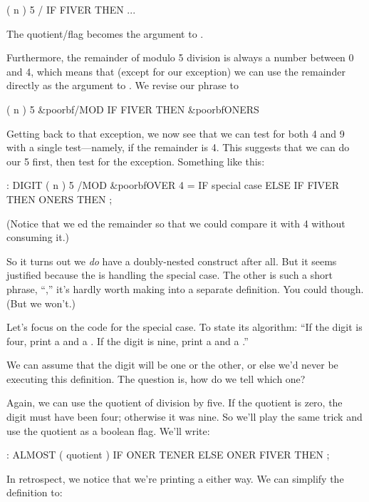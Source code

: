 \begin{Code}
( n )  5 / IF FIVER THEN ...
\end{Code}
The quotient/flag becomes the argument to .

Furthermore, the remainder of modulo 5 division is always a number between
0 and 4, which means that (except for our exception) we can use the
remainder directly as the argument to . We revise our phrase
to

\begin{Code}[commandchars=\&\{\}]
( n )  5 &poorbf{/MOD} IF FIVER THEN  &poorbf{ONERS}
\end{Code}
Getting back to that exception, we now see that we can test for both 4 and
9 with a single test---namely, if the remainder is 4. This suggests that
we can do our 5  first, then test for the exception.
Something like this:

\begin{Code}[commandchars=\&\{\}]
: DIGIT  ( n )
     5 /MOD  &poorbf{OVER 4 =  IF  special case  ELSE}
     IF FIVER THEN  ONERS  THEN ;
\end{Code}
(Notice that we ed the remainder so that we could compare it with
4 without consuming it.)

So it turns out we \emph{do} have a doubly-nested 
construct after all. But it seems justified because the 
is handling the special case. The other is such a short phrase,
``,'' it's hardly worth making into a separate
definition. You could though. (But we won't.)

Let's focus on the code for the special case. To state its algorithm: ``If
the digit is four, print a  and a . If the digit
is nine, print a  and a .''

We can assume that the digit will be one or the other, or else we'd never
be executing this definition. The question is, how do we tell which one?

Again, we can use the quotient of division by five. If the quotient is
zero, the digit must have been four; otherwise it was nine. So we'll play
the same trick and use the quotient as a boolean flag. We'll write:

\begin{Code}
: ALMOST  ( quotient )
     IF  ONER TENER  ELSE  ONER FIVER  THEN ;
\end{Code}
In retrospect, we notice that we're printing a  either way. We
can simplify the definition to:


